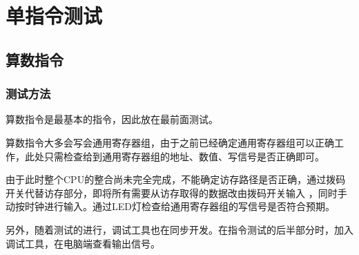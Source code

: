 \section{单指令测试}

    \subsection{算数指令}

        \subsubsection{测试方法}
            算数指令是最基本的指令，因此放在最前面测试。

            算数指令大多会写会通用寄存器组，由于之前已经确定通用寄存器组可以正确工作，此处只需检查给到通用寄存器组的地址、数值、写信号是否正确即可。

            由于此时整个CPU的整合尚未完全完成，不能确定访存路径是否正确，通过拨码开关代替访存部分，即将所有需要从访存取得的数据改由拨码开关输入%
            ，同时手动按时钟进行输入。通过LED灯检查给通用寄存器组的写信号是否符合预期。

            另外，随着测试的进行，调试工具也在同步开发。在指令测试的后半部分时，加入调试工具，在电脑端查看输出信号。

